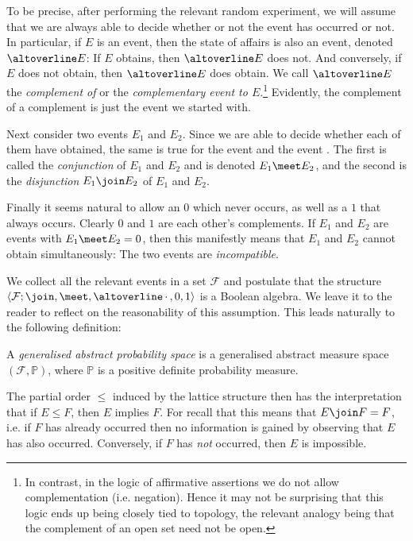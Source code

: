 \documentclass[article, a4paper, 11pt, oneside]{memoir}
\numberwithin{equation}{chapter}
\newcommand{\calF}{\mathcal{F}}
\renewcommand{\P}{\mathbb{P}}
\begin{document}
To be precise, after performing the relevant random experiment, we will assume that we are always able to decide whether or not the event has occurred or not. In particular, if $E$ is an event, then the state of affairs  is also an event, denoted $\compl{E}$: If $E$ obtains, then $\compl{E}$ does not. And conversely, if $E$ does not obtain, then $\compl{E}$ does obtain. We call $\compl{E}$ the \emph{complement of} or the \emph{complementary event to $E$}.\footnote{In contrast, in the logic of affirmative assertions we do not allow complementation (i.e. negation). Hence it may not be surprising that this logic ends up being closely tied to topology, the relevant analogy being that the complement of an open set need not be open.} Evidently, the complement of a complement is just the event we started with.

Next consider two events $E_1$ and $E_2$. Since we are able to decide whether each of them have obtained, the same is true for the event  and the event . The first is called the \emph{conjunction} of $E_1$ and $E_2$ and is denoted $E_1 \meet E_2$, and the second is the \emph{disjunction} $E_1 \join E_2$ of $E_1$ and $E_2$.

Finally it seems natural to allow an  $0$ which never occurs, as well as a  $1$ that always occurs. Clearly $0$ and $1$ are each other's complements. If $E_1$ and $E_2$ are events with $E_1 \meet E_2 = 0$, then this manifestly means that $E_1$ and $E_2$ cannot obtain simultaneously: The two events are \emph{incompatible}.

We collect all the relevant events in a set $\calF$ and postulate that the structure $\langle \calF; \join, \meet, \compl{\,\cdot\,\vphantom{e}}, 0, 1 \rangle$ is a Boolean algebra. We leave it to the reader to reflect on the reasonability of this assumption. This leads naturally to the following definition:

\begin{definition}
    A \emph{generalised abstract probability space} is a generalised abstract measure space $(\calF, \P)$, where $\P$ is a positive definite probability measure.
\end{definition}
%
The partial order $\leq$ induced by the lattice structure then has the interpretation that if $E \leq F$, then $E$ implies $F$. For recall that this means that $E \join F = F$, i.e. if $F$ has already occurred then no information is gained by observing that $E$ has also occurred. Conversely, if $F$ has \emph{not} occurred, then $E$ is impossible.
\end{document}
